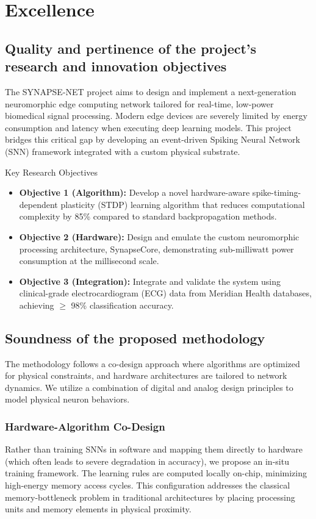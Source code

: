 \documentclass[11pt,a4paper]{article}
\begin{document}
\section{Excellence}
\subsection{Quality and pertinence of the project's research and innovation objectives}
The SYNAPSE-NET project aims to design and implement a next-generation neuromorphic edge computing network tailored for real-time, low-power biomedical signal processing. Modern edge devices are severely limited by energy consumption and latency when executing deep learning models. This project bridges this critical gap by developing an event-driven Spiking Neural Network (SNN) framework integrated with a custom physical substrate.

\vspace{0.4cm}
\begin{mscabox}{Key Research Objectives}
\begin{itemize}[leftmargin=*]
  \item \textbf{Objective 1 (Algorithm):} Develop a novel hardware-aware spike-timing-dependent plasticity (STDP) learning algorithm that reduces computational complexity by 85\% compared to standard backpropagation methods.
  \item \textbf{Objective 2 (Hardware):} Design and emulate the custom neuromorphic processing architecture, SynapseCore, demonstrating sub-milliwatt power consumption at the millisecond scale.
  \item \textbf{Objective 3 (Integration):} Integrate and validate the system using clinical-grade electrocardiogram (ECG) data from Meridian Health databases, achieving $\ge$ 98\% classification accuracy.
\end{itemize}
\end{mscabox}
\vspace{0.2cm}

\subsection{Soundness of the proposed methodology}
The methodology follows a co-design approach where algorithms are optimized for physical constraints, and hardware architectures are tailored to network dynamics. We utilize a combination of digital and analog design principles to model physical neuron behaviors.

\subsubsection{Hardware-Algorithm Co-Design}
Rather than training SNNs in software and mapping them directly to hardware (which often leads to severe degradation in accuracy), we propose an in-situ training framework. The learning rules are computed locally on-chip, minimizing high-energy memory access cycles. This configuration addresses the classical memory-bottleneck problem in traditional architectures by placing processing units and memory elements in physical proximity.
\end{document}
